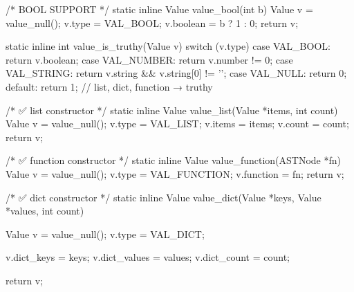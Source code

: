 \documentclass{article}
\begin{document}
/* BOOL SUPPORT */
static inline Value value_bool(int b)
{
    Value v = value_null();
    v.type = VAL_BOOL;
    v.boolean = b ? 1 : 0;
    return v;
}

static inline int value_is_truthy(Value v)
{
    switch (v.type) {
        case VAL_BOOL:   return v.boolean;
        case VAL_NUMBER: return v.number != 0;
        case VAL_STRING: return v.string && v.string[0] != '\0';
        case VAL_NULL:   return 0;
        default:         return 1;  // list, dict, function → truthy
    }
}


/* ✅ list constructor */
static inline Value value_list(Value *items, int count)
{
    Value v = value_null();
    v.type = VAL_LIST;
    v.items = items;
    v.count = count;
    return v;
}

/* ✅ function constructor */
static inline Value value_function(ASTNode *fn)
{
    Value v = value_null();
    v.type = VAL_FUNCTION;
    v.function = fn;
    return v;
}

/* ✅ dict constructor */
static inline Value value_dict(Value *keys, Value *values, int count)
{
    Value v = value_null();
    v.type = VAL_DICT;

    v.dict_keys = keys;
    v.dict_values = values;
    v.dict_count = count;

    return v;
}
\end{document}
